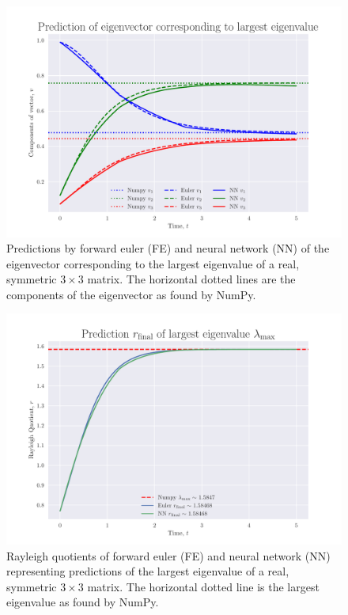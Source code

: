 \documentclass[12pt]{extarticle}
\begin{document}
\begin{figure}[h]
	\centering
	\includegraphics[scale=0.75]{../output/plots/eigvec_T5_N1000.pdf}
	\caption{Predictions by forward euler (FE) and neural network (NN) of the eigenvector corresponding to the largest eigenvalue of a real, symmetric $3\times 3$ matrix. The horizontal dotted lines are the components of the eigenvector as found by NumPy.}
	\label{fig:eigvec_T5_N1000}
\end{figure}

\begin{figure}[h]
	\centering
	\includegraphics[scale=0.75]{../output/plots/eigval_T5_N1000.pdf}
	\caption{Rayleigh quotients of forward euler (FE) and neural network (NN) representing predictions of the largest eigenvalue of a real, symmetric $3\times 3$ matrix. The horizontal dotted line is the largest eigenvalue as found by NumPy.}
	\label{fig:eigval_T5_N1000}
\end{figure}
\end{document}
